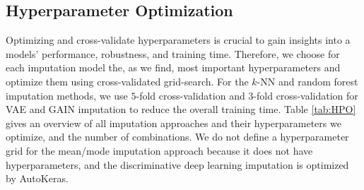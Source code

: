 \subsection{Hyperparameter Optimization}
\label{sec:HPO}
%
Optimizing and cross-validate hyperparameters is crucial to gain insights into a models' performance, robustness, and training time. Therefore, we choose for each imputation model the, as we find, most important hyperparameters and optimize them using cross-validated grid-search. For the $k$-NN and random forest imputation methods, we use $5$-fold cross-validation and $3$-fold cross-validation for VAE and GAIN imputation to reduce the overall training time. Table \ref{tab:HPO} gives an overview of all imputation approaches and their hyperparameters we optimize, and the number of combinations. We do not define a hyperparameter grid for the mean/mode imputation approach because it does not have hyperparameters, and the discriminative deep learning imputation is optimized by AutoKeras.
%
